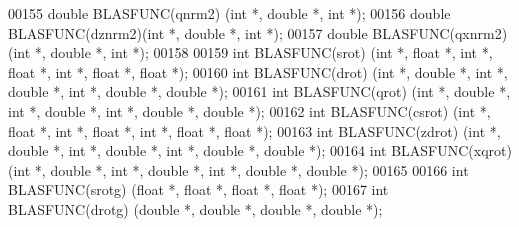 \begin{DoxyCode}
00155 \textcolor{keywordtype}{double} BLASFUNC(qnrm2) (\textcolor{keywordtype}{int} *, \textcolor{keywordtype}{double} *, \textcolor{keywordtype}{int} *);
00156 \textcolor{keywordtype}{double} BLASFUNC(dznrm2)(\textcolor{keywordtype}{int} *, \textcolor{keywordtype}{double} *, \textcolor{keywordtype}{int} *);
00157 \textcolor{keywordtype}{double} BLASFUNC(qxnrm2)(\textcolor{keywordtype}{int} *, \textcolor{keywordtype}{double} *, \textcolor{keywordtype}{int} *);
00158 
00159 \textcolor{keywordtype}{int}    BLASFUNC(srot)  (\textcolor{keywordtype}{int} *, \textcolor{keywordtype}{float}  *, \textcolor{keywordtype}{int} *, \textcolor{keywordtype}{float}  *, \textcolor{keywordtype}{int} *, \textcolor{keywordtype}{float}  *, \textcolor{keywordtype}{float}  *);
00160 \textcolor{keywordtype}{int}    BLASFUNC(drot)  (\textcolor{keywordtype}{int} *, \textcolor{keywordtype}{double} *, \textcolor{keywordtype}{int} *, \textcolor{keywordtype}{double} *, \textcolor{keywordtype}{int} *, \textcolor{keywordtype}{double} *, \textcolor{keywordtype}{double} *);
00161 \textcolor{keywordtype}{int}    BLASFUNC(qrot)  (\textcolor{keywordtype}{int} *, \textcolor{keywordtype}{double} *, \textcolor{keywordtype}{int} *, \textcolor{keywordtype}{double} *, \textcolor{keywordtype}{int} *, \textcolor{keywordtype}{double} *, \textcolor{keywordtype}{double} *);
00162 \textcolor{keywordtype}{int}    BLASFUNC(csrot) (\textcolor{keywordtype}{int} *, \textcolor{keywordtype}{float}  *, \textcolor{keywordtype}{int} *, \textcolor{keywordtype}{float}  *, \textcolor{keywordtype}{int} *, \textcolor{keywordtype}{float}  *, \textcolor{keywordtype}{float}  *);
00163 \textcolor{keywordtype}{int}    BLASFUNC(zdrot) (\textcolor{keywordtype}{int} *, \textcolor{keywordtype}{double} *, \textcolor{keywordtype}{int} *, \textcolor{keywordtype}{double} *, \textcolor{keywordtype}{int} *, \textcolor{keywordtype}{double} *, \textcolor{keywordtype}{double} *);
00164 \textcolor{keywordtype}{int}    BLASFUNC(xqrot) (\textcolor{keywordtype}{int} *, \textcolor{keywordtype}{double} *, \textcolor{keywordtype}{int} *, \textcolor{keywordtype}{double} *, \textcolor{keywordtype}{int} *, \textcolor{keywordtype}{double} *, \textcolor{keywordtype}{double} *);
00165 
00166 \textcolor{keywordtype}{int}    BLASFUNC(srotg) (\textcolor{keywordtype}{float}  *, \textcolor{keywordtype}{float}  *, \textcolor{keywordtype}{float}  *, \textcolor{keywordtype}{float}  *);
00167 \textcolor{keywordtype}{int}    BLASFUNC(drotg) (\textcolor{keywordtype}{double} *, \textcolor{keywordtype}{double} *, \textcolor{keywordtype}{double} *, \textcolor{keywordtype}{double} *);

\end{DoxyCode}
